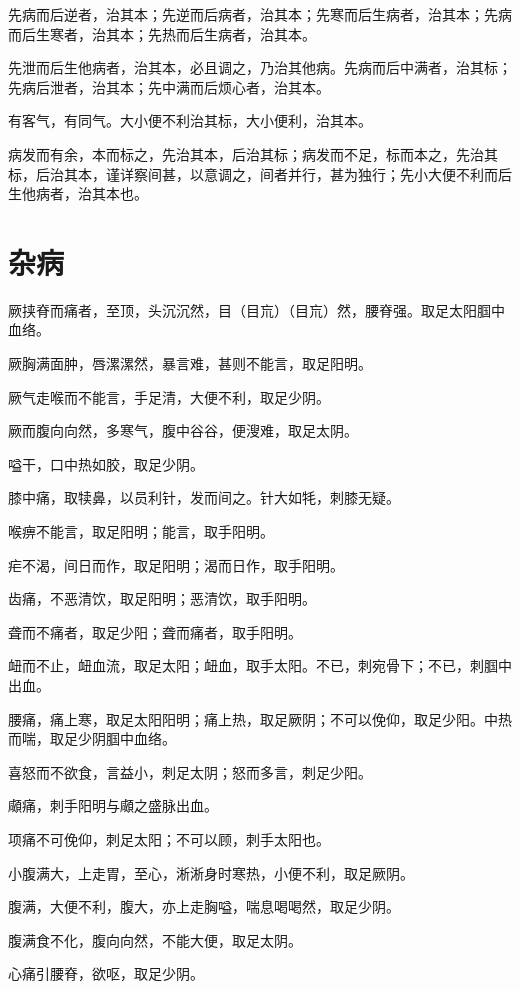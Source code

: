 \documentclass[a4paper,12pt,UTF8,twoside]{ctexbook}
\begin{document}
	先病而后逆者，治其本；先逆而后病者，治其本；先寒而后生病者，治其本；先病而后生寒者，治其本；先热而后生病者，治其本。
	
	先泄而后生他病者，治其本，必且调之，乃治其他病。先病而后中满者，治其标；先病后泄者，治其本；先中满而后烦心者，治其本。
	
	有客气，有同气。大小便不利治其标，大小便利，治其本。
	
	病发而有余，本而标之，先治其本，后治其标；病发而不足，标而本之，先治其标，后治其本，谨详察间甚，以意调之，间者并行，甚为独行；先小大便不利而后生他病者，治其本也。
	\chapter{杂病}
	
	厥挟脊而痛者，至顶，头沉沉然，目（目巟）（目巟）然，腰脊强。取足太阳腘中血络。
	
	厥胸满面肿，唇漯漯然，暴言难，甚则不能言，取足阳明。
	
	厥气走喉而不能言，手足清，大便不利，取足少阴。
	
	厥而腹向向然，多寒气，腹中谷谷，便溲难，取足太阴。
	
	嗌干，口中热如胶，取足少阴。
	
	膝中痛，取犊鼻，以员利针，发而间之。针大如牦，刺膝无疑。
	
	喉痹不能言，取足阳明；能言，取手阳明。
	
	疟不渴，间日而作，取足阳明；渴而日作，取手阳明。
	
	齿痛，不恶清饮，取足阳明；恶清饮，取手阳明。
	
	聋而不痛者，取足少阳；聋而痛者，取手阳明。
	
	衄而不止，衄血流，取足太阳；衄血，取手太阳。不已，刺宛骨下；不已，刺腘中出血。
	
	腰痛，痛上寒，取足太阳阳明；痛上热，取足厥阴；不可以俛仰，取足少阳。中热而喘，取足少阴腘中血络。
	
	喜怒而不欲食，言益小，刺足太阴；怒而多言，刺足少阳。
	
	顑痛，刺手阳明与顑之盛脉出血。
	
	项痛不可俛仰，刺足太阳；不可以顾，刺手太阳也。
	
	小腹满大，上走胃，至心，淅淅身时寒热，小便不利，取足厥阴。
	
	腹满，大便不利，腹大，亦上走胸嗌，喘息喝喝然，取足少阴。
	
	腹满食不化，腹向向然，不能大便，取足太阴。
	
	心痛引腰脊，欲呕，取足少阴。
	
\end{document}
